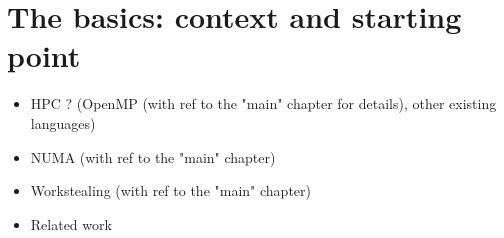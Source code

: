 \part{The basics: context and starting point}

\begin{itemize}
  \item HPC ? (OpenMP (with ref to the "main" chapter for details), other existing languages)
  \item NUMA (with ref to the "main" chapter)
  \item Workstealing (with ref to the "main" chapter)
  \item Related work
\end{itemize}

